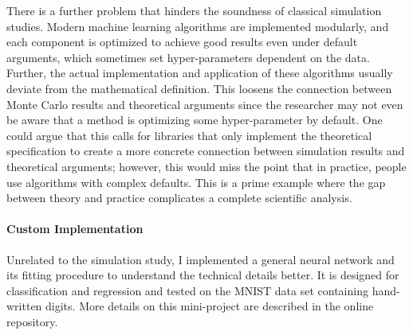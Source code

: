 There is a further problem that hinders the soundness of classical simulation studies.
Modern machine learning algorithms are implemented modularly, and each component is
optimized to achieve good results even under default arguments, which sometimes set
hyper-parameters dependent on the data. Further, the actual implementation and
application of these algorithms usually deviate from the mathematical definition. This
loosens the connection between Monte Carlo results and theoretical arguments since the
researcher may not even be aware that a method is optimizing some hyper-parameter by
default. One could argue that this calls for libraries that only implement the
theoretical specification to create a more concrete connection between simulation
results and theoretical arguments; however, this would miss the point that in practice,
people use algorithms with complex defaults. This is a prime example where the gap
between theory and practice complicates a complete scientific analysis.

\paragraph{Custom Implementation}

Unrelated to the simulation study, I implemented a general neural network and its
fitting procedure to understand the technical details better. It is designed for
classification and regression and tested on the MNIST data set containing hand-written
digits. More details on this mini-project are described in the online repository.
